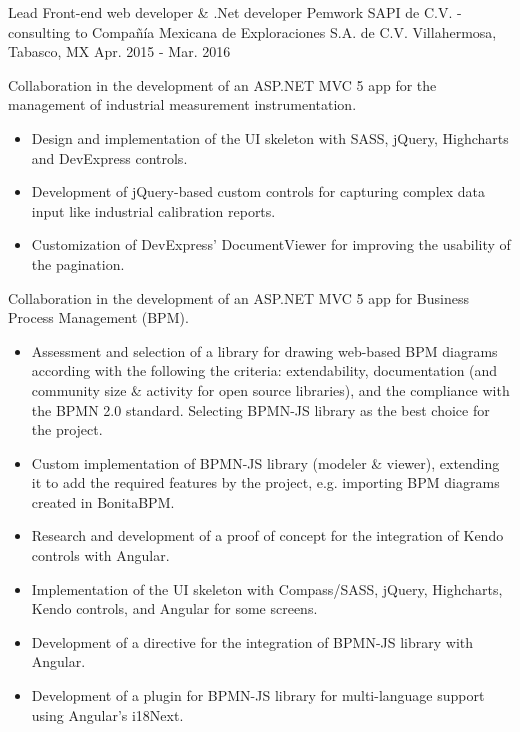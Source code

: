 \begin{cventries}

\cventry
{Lead Front-end web developer \& .Net developer} %
{Pemwork SAPI de C.V. - consulting to Compañía Mexicana de Exploraciones S.A. de C.V.} %
{Villahermosa, Tabasco, MX} %
{Apr. 2015 - Mar. 2016} %
{ %
	\begin{cvitems}
		\item{Collaboration in the development of an ASP.NET MVC 5 app for the management of industrial measurement instrumentation.}
		\begin{itemize}
			\item{Design and implementation of the UI skeleton with SASS, jQuery, Highcharts and DevExpress controls.}
			\item{Development of jQuery-based custom controls for capturing complex data input like industrial calibration reports.}
			\item{Customization of DevExpress' DocumentViewer for improving the usability of the pagination.}
		\end{itemize}		
		\item{Collaboration in the development of an ASP.NET MVC 5 app for Business Process Management (BPM).}
		\begin{itemize}
			\item{Assessment and selection of a library for drawing web-based BPM diagrams according with the following the criteria: extendability, documentation (and community size \& activity for open source libraries), and the compliance with the BPMN 2.0 standard. Selecting BPMN-JS library as the best choice for the project.}
			\item{Custom implementation of BPMN-JS library (modeler \& viewer), extending it to add the required features by the project, e.g. importing BPM diagrams created in BonitaBPM.}
			\item{Research and development of a proof of concept for the integration of Kendo controls with Angular.}
			\item{Implementation of the UI skeleton with Compass/SASS, jQuery, Highcharts, Kendo controls, and Angular for some screens.}
			\item{Development of a directive for the integration of BPMN-JS library with Angular.}
			\item{Development of a plugin for BPMN-JS library for multi-language support using Angular's i18Next.}
		\end{itemize}
	\end{cvitems}
}


\end{cventries}
